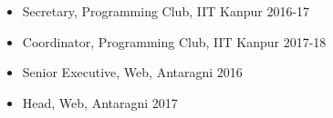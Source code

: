 
{\fontsize{11pt}{1em}\bodyfontlight\upshape\color{text}
  \begin{itemize}
  \item Secretary, Programming Club, IIT Kanpur 2016-17
  \item Coordinator, Programming Club, IIT Kanpur 2017-18
  \item Senior Executive, Web, Antaragni 2016
  \item Head, Web, Antaragni 2017
  \end{itemize}
}
